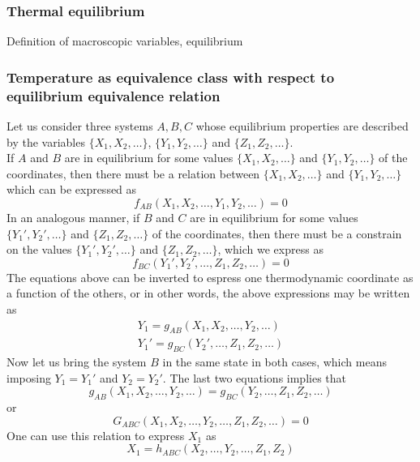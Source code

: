 \subsubsection*{Thermal equilibrium}
Definition of macroscopic variables, equilibrium
\subsubsection*{Temperature as equivalence class with respect to equilibrium equivalence relation}
Let us consider three systems $A, B, C$ whose equilibrium properties are described by the variables
$\{X_1, X_2, \dots\}$, $\{Y_1, Y_2, \dots\}$ and $\{Z_1, Z_2, \dots\}$. \\
If $A$ and $B$ are in equilibrium for some values $\{X_1, X_2, \dots\}$ and $\{Y_1, Y_2, \dots\}$ of the coordinates, then there must be a relation between $\{X_1, X_2, \dots\}$ and $\{Y_1, Y_2, \dots\}$ which can be expressed as
\begin{equation*}
    f_{AB}(X_1, X_2, \dots, Y_1, Y_2, \dots) = 0
\end{equation*}
In an analogous manner, if $B$ and $C$ are in equilibrium for some values $\{Y_1', Y_2', \dots\}$ and $\{Z_1, Z_2, \dots\}$ of the coordinates, then there must be a constrain on the values $\{Y_1', Y_2', \dots\}$ and $\{Z_1, Z_2, \dots\}$, which we express as
\begin{equation*}
    f_{BC}(Y_1', Y_2', \dots, Z_1, Z_2, \dots) = 0
\end{equation*}
The equations above can be inverted to espress one thermodynamic coordinate as a function of the others, or in other words, the above expressions may be written as
\begin{gather*}
    Y_1 = g_{AB} (X_1, X_2, \dots, Y_2, \dots) \\
    Y_1' = g_{BC} (Y_2', \dots, Z_1, Z_2, \dots)
\end{gather*}
Now let us bring the system $B$ in the same state in both cases, which means imposing $Y_1 = Y_1'$ and $Y_2 = Y_2'$. The last two equations implies that 
\begin{equation}
    g_{AB} (X_1, X_2, \dots, Y_2, \dots) = g_{BC} (Y_2, \dots, Z_1, Z_2, \dots)
    \label{eq:equality_of_g}
\end{equation}
or
\begin{equation*}
    G_{ABC} (X_1, X_2, \dots, Y_2, \dots, Z_1, Z_2, \dots) = 0
\end{equation*}
One can use this relation to express $X_1$ as 
\begin{equation}
    X_1 = h_{ABC}(X_2, \dots, Y_2, \dots, Z_1, Z_2)
    \label{eq:X1_equilibrium_ABC}
\end{equation}
